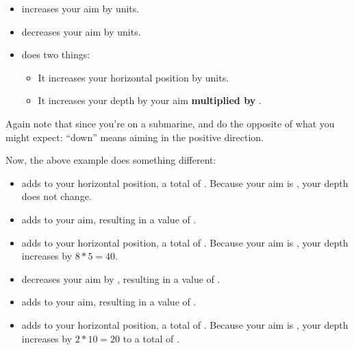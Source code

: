 \begin{itemize}
\item {\Tt{}\nwendquote} increases your aim by  units.
\item {\Tt{}\nwendquote} decreases your aim by  units.
\item {\Tt{}\nwendquote} does two things:
  \begin{itemize}
  \item It increases your horizontal position by  units.
  \item It increases your depth by your aim \textbf{multiplied by} .
  \end{itemize}
\end{itemize}

Again note that since you're on a submarine, {\Tt{}\nwendquote} and {\Tt{}\nwendquote} do the opposite of what you might expect: ``down'' means aiming in the positive direction.

Now, the above example does something different:
\begin{itemize}
\item {\Tt{}\nwendquote} adds  to your horizontal position, a total of . Because your aim is , your depth does not change.
\item {\Tt{}\nwendquote} adds  to your aim, resulting in a value of .
\item {\Tt{}\nwendquote} adds  to your horizontal position, a total of . Because your aim is , your depth increases by $8*5=40$.
\item {\Tt{}\nwendquote} decreases your aim by , resulting in a value of .
\item {\Tt{}\nwendquote} adds  to your aim, resulting in a value of .
\item {\Tt{}\nwendquote} adds  to your horizontal position, a total of . Because your aim is , your depth increases by $2*10=20$ to a total of .
\end{itemize}

